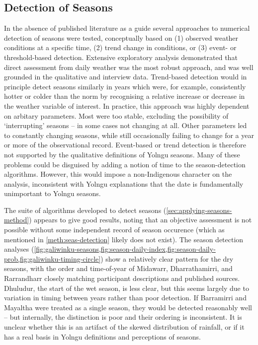 \subsection{Detection of Seasons}
\label{subsec:disc-season-detection}

In the absence of published literature as a guide several approaches to numerical
detection of seasons were tested, conceptually based on (1) observed weather conditions
at a specific time, (2) trend change in conditions, or (3) event- or threshold-based
detection.  Extensive exploratory analysis demonstrated that direct assessment
from daily weather was the most robust approach, and was well grounded in the
qualitative and interview data.
%
Trend-based detection would in principle detect seasons similarly in years
which were, for example, consistently hotter or colder than the norm by recognising
a relative increase or decrease in the weather variable of interest.
In practice, this approach was highly dependent on arbitary parameters.
Most were too stable, excluding the possibility of `interrupting' seasons --
in some cases not changing at all.  Other parameters led to constantly
changing seasons, while still occasionally failing to change for a
year or more of the observational record.  Event-based or trend detection
is therefore not supported by the qualitative definitions of Yolngu seasons.
%
Many of these problems could be disguised by adding a notion of time to the
season-detection algorithms.  However, this would impose a non-Indigenous
character on the analysis, inconsistent with Yolngu explanations that the date
is fundamentally unimportant to Yolngu seasons.


The suite of algorithms developed to detect seasons (\cref{sec:applying-seasons-method})
appears to give good results, noting that an objective assessment is not
possible without some independent record of season occurence (which as
mentioned in \cref{meth:seas-detection} likely does not exist).
%
The season detection analyses
(\cref{fig:galiwinku-seasons,fig:season-daily-index,fig:season-daily-prob,fig:galiwinku-timing-circle})
show a relatively clear pattern for the
dry seasons, with the order and time-of-year of Midawarr, Dharrathamirri, and
Rarrandharr closely matching participant descriptions and published sources.
Dhuludur, the start of the wet season, is less clear, but this seems largely due to variation in timing between
years rather than poor detection.  If Barramirri and Mayaltha were treated as
a single season, they would be detected reasonably well -- but internally,
the distinction is poor and their ordering is inconsistent. It is unclear
whether this is an artifact of the skewed distribution of rainfall,
or if it has a real basis in Yolngu definitions and perceptions of seasons.


